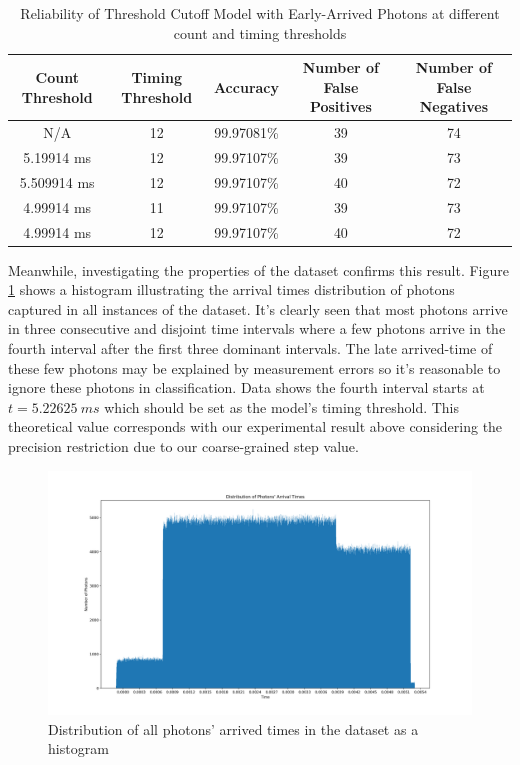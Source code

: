 \documentclass[letterpaper,twocolumn,10pt]{article}
\begin{document}
\begin{table}
    \caption{Reliability of Threshold Cutoff Model with Early-Arrived Photons at different count and timing thresholds}
    \begin{center}
        \begin{tabular}{c c c c c}
            Count Threshold & Timing Threshold & Accuracy & Number of False Positives & Number of False Negatives \\ [0.5ex] 
            \hline
            N/A	& 12 & 99.97081\% & 39 & 74 \\
            5.19914	ms & 12 & 99.97107\% & 39 & 73 \\ 
            5.509914 ms & 12 & 99.97107\% & 40 & 72 \\
            4.99914 ms & 11 & 99.97107\% & 39 & 73 \\
            4.99914 ms & 12 & 99.97107\% & 40 & 72 \\
       \end{tabular}
    \end{center}
    \label{table:threshold_cutoff_early_arrival}  
\end{table}

Meanwhile, investigating the properties of the dataset confirms this result. Figure \ref{fig:distro_photons_arrival_times} shows a histogram illustrating the arrival times distribution of photons captured in all instances of the dataset. It's clearly seen that most photons arrive in three consecutive and disjoint time intervals where a few photons arrive in the fourth interval after the first three dominant intervals. The late arrived-time of these few photons may be explained by measurement errors so it's reasonable to ignore these photons in classification. Data shows the fourth interval starts at $t = 5.22625 \ ms$ which should be set as the model's timing threshold. This theoretical value corresponds with our experimental result above considering the precision restriction due to our coarse-grained step value.

\begin{figure}
    \includegraphics[width=\linewidth]{Figures/distro_photons_arrival_times.png}
    \centering
    \caption{Distribution of all photons' arrived times in the dataset as a histogram}
    \label{fig:distro_photons_arrival_times}
\end{figure}
\end{document}
